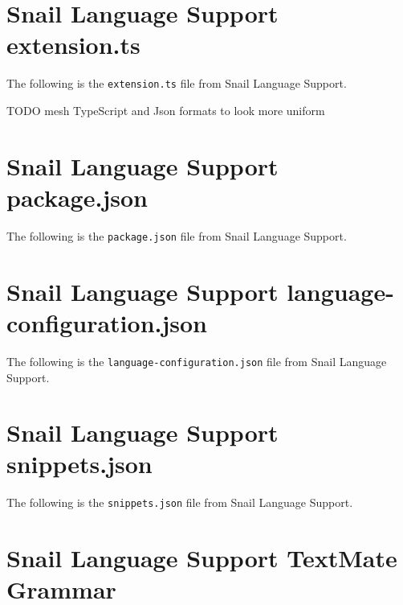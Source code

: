 \documentclass{article}
\begin{document}
\begin{appendices}

\section{Snail Language Support extension.ts}

    The following is the \lstinline{extension.ts} file from Snail Language Support.

    TODO mesh TypeScript and Json formats to look more uniform

    
    \label{app:extension-ts}

\newpage
\section{Snail Language Support package.json}

    The following is the \lstinline{package.json} file from Snail Language Support.
    
    \label{app:package-json}

\newpage
\section{Snail Language Support language-configuration.json}

    The following is the \lstinline{language-configuration.json} file from Snail Language Support.
    
    \label{app:language-configuration}

\newpage
\section{Snail Language Support snippets.json}

    The following is the \lstinline{snippets.json} file from Snail Language Support.
    
    \label{app:snippets-json}

\newpage
\section{Snail Language Support TextMate Grammar}


\end{appendices}
\end{document}
